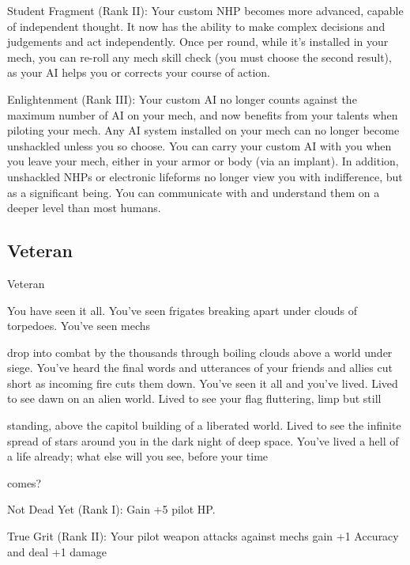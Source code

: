 Student Fragment (Rank II): Your custom NHP becomes more advanced, capable of  
independent thought. It now has the ability to make complex decisions and judgements and act  
independently. Once per round, while it’s installed in your mech, you can re-roll any mech skill  
check (you must choose the second result), as your AI helps you or corrects your course of  
action.
 
Enlightenment (Rank III): Your custom AI no longer counts against the maximum number of AI  
on your mech, and now benefits from your talents when piloting your mech. Any AI system  
installed on your mech can no longer become unshackled unless you so choose. You can carry  
your custom AI with you when you leave your mech, either in your armor or body (via an implant).  
In addition, unshackled NHPs or electronic lifeforms no longer view you with indifference, but as  
a significant being. You can communicate with and understand them on a deeper level than most  
humans. 
 
\subsection{Veteran}

                                                     Veteran  

You have seen it all. You’ve seen frigates breaking apart under clouds of torpedoes. You’ve seen mechs  

drop into combat by the thousands through boiling clouds above a world under siege. You’ve heard the  
final words and utterances of your friends and allies cut short as incoming fire cuts them down. You’ve seen  
it all and you’ve lived. Lived to see dawn on an alien world. Lived to see your flag fluttering, limp but still  

standing, above the capitol building of a liberated world. Lived to see the infinite spread of stars around you  
in the dark night of deep space. You’ve lived a hell of a life already; what else will you see, before your time  

comes?    

Not Dead Yet (Rank I): Gain +5 pilot HP.
 

                                                                                                                    


True Grit (Rank II): Your pilot weapon attacks against mechs gain +1 Accuracy and deal +1  
damage
 
